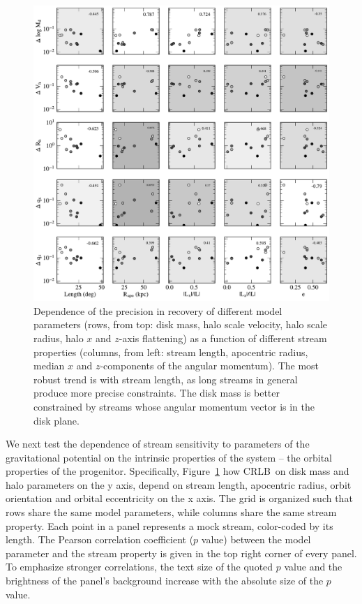 \documentclass[modern]{aastex61}
\newcommand{\acronym}[1]{{\small{#1}}}
\newcommand{\CRLB}{\acronym{CRLB}}
\begin{document}
\begin{figure}
\begin{center}
\includegraphics[width=\textwidth]{orbit_correlations.pdf}
\caption{Dependence of the precision in recovery of different model parameters (rows, from top: disk mass, halo scale velocity, halo scale radius, halo $x$ and $z$-axis flattening) as a function of different stream properties (columns, from left: stream length, apocentric radius, median $x$ and $z$-components of the angular momentum).
The most robust trend is with stream length, as long streams in general produce more precise constraints.
The disk mass is better constrained by streams whose angular momentum vector is in the disk plane.}
\label{fig:orbit_correlations}
\end{center}
\end{figure}

We next test the dependence of stream sensitivity to parameters of the gravitational potential on the intrinsic properties of the system -- the orbital properties of the progenitor.
Specifically, Figure~\ref{fig:orbit_correlations} how \CRLB\ on disk mass and halo parameters on the y axis, depend on stream length, apocentric radius, orbit orientation and orbital eccentricity on the x axis.
The grid is organized such that rows share the same model parameters, while columns share the same stream property.
Each point in a panel represents a mock stream, color-coded by its length.
The Pearson correlation coefficient ($p$ value) between the model parameter and the stream property is given in the top right corner of every panel.
To emphasize stronger correlations, the text size of the quoted $p$ value and the brightness of the panel's background increase with the absolute size of the $p$ value.
\end{document}
